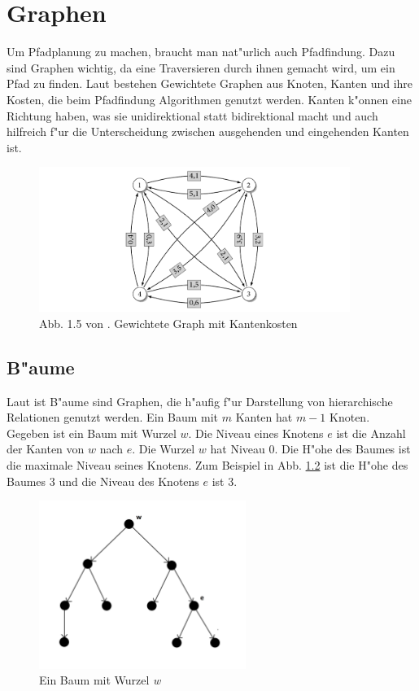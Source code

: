 \chapter{Graphen}

Um Pfadplanung zu machen, braucht man nat"urlich auch Pfadfindung. Dazu sind Graphen wichtig, da eine Traversieren durch ihnen gemacht wird, um ein Pfad zu finden. Laut \cite{Turau:15} bestehen Gewichtete Graphen aus Knoten, Kanten und ihre Kosten, die beim Pfadfindung Algorithmen genutzt werden. Kanten k"onnen eine Richtung haben, was sie unidirektional statt bidirektional macht und auch hilfreich f"ur die Unterscheidung zwischen ausgehenden und eingehenden Kanten ist.

\begin{figure} %
	\centering
	\includegraphics[width=0.9\textwidth]{images/kk_graph_S6.png}
	\caption{Abb. 1.5 von \cite[~S. 6]{Turau:15}. Gewichtete Graph mit Kantenkosten}
	\label{sec0a}
\end{figure}

\section{B"aume}
Laut \cite{Turau:15} ist B"aume sind Graphen, die h"aufig f"ur Darstellung von hierarchische Relationen genutzt werden. Ein Baum mit $m$ Kanten hat $m-1$ Knoten.\\
Gegeben ist ein Baum mit Wurzel $w$. Die Niveau eines Knotens $e$ ist die Anzahl der Kanten von $w$ nach $e$. Die Wurzel $w$ hat Niveau 0. Die H"ohe des Baumes ist die maximale Niveau seines Knotens. Zum Beispiel in Abb. \ref{sec0b} ist die H"ohe des Baumes 3 und die Niveau des Knotens $e$ ist 3.

\begin{figure} %
	\centering
	\includegraphics[width=0.6\textwidth]{images/Tree_Graph.png}
	\caption{Ein Baum mit Wurzel \textit{w}}
	\label{sec0b}
\end{figure}

